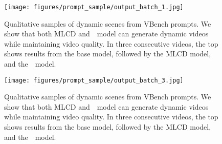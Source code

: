 \begin{comment}
\begin{figure}[t]
  \centering
  \texttt{[image: figures/prompt\_sample/Quanlitive Result.pdf]}
  \texttt{[image: figures/prompt\_sample/Quanlitive Result.pdf]}
  \caption{Dynamic prompts featuring forceful physical movements (like kicking) and swirling environmental effects (like waves), transitioning from calm to intense states.}
  \label{fig:vis3}
\end{figure}
\end{comment}

\begin{figure}[t]
  \centering
  \texttt{[image: figures/prompt\_sample/output\_batch\_1.jpg]}
  \caption{Qualitative samples of dynamic scenes from VBench prompts. We show that both MLCD  and~\methodname~model can generate dynamic videos while maintaining video quality. In three consecutive videos, the top shows results from the base model, followed by the MLCD model, and the~\methodname~model.}
  \label{fig:vbench1}
\end{figure}

\begin{comment}
\begin{figure}[t]
  \centering
  \texttt{[image: figures/prompt\_sample/output\_batch\_2.jpg]}
  \caption{Qualitative samples of dynamic scenes from VBench prompts. We show that both MLCD  and~\methodname~model can generate dynamic videos while maintaining video quality. In three consecutive videos, the top shows results from the base model, followed by the MLCD model, and the~\methodname~model.}
  \label{fig:vbench2}
\end{figure}
\end{comment}

\begin{figure}[t]
  \centering
  \texttt{[image: figures/prompt\_sample/output\_batch\_3.jpg]}
  \caption{Qualitative samples of dynamic scenes from VBench prompts. We show that both MLCD  and~\methodname~model can generate dynamic videos while maintaining video quality. In three consecutive videos, the top shows results from the base model, followed by the MLCD model, and the~\methodname~model.}
  \label{fig:vbench3}
\end{figure}

